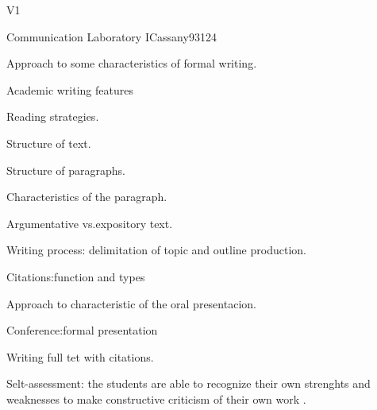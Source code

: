 \begin{syllabus}
\begin{competences}{V1}
    \item {}
    \item {}
    \item {}
\end{competences}

\begin{unit}{Communication Laboratory I}{}{Cassany93}{12}{4}
   \begin{topics}
      \item Approach to some characteristics of formal writing.
      \item Academic writing features
      \item Reading strategies.
      \item Structure of text.
      \item Structure of paragraphs.
      \item Characteristics of the paragraph.
      \item Argumentative vs.expository text.
      \item Writing process: delimitation of topic and outline production.
      \item Citations:function and types
      \item Approach to characteristic of the oral presentacion.
      \item Conference:formal presentation
      \item Writing full tet with citations.
   \end{topics}
   \begin{learningoutcomes}
      \item Selt-assessment: the students are able to recognize their own strenghts and weaknesses to make constructive criticism of their own work .
   \end{learningoutcomes}
\end{unit}

\begin{coursebibliography}
\end{coursebibliography}

\end{syllabus}
